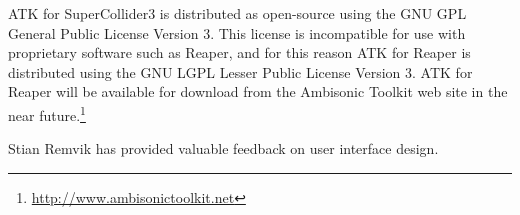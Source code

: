 \documentclass{article}
\begin{document}
ATK for SuperCollider3 is distributed as open-source using the GNU GPL General Public License Version 3.
This license is incompatible for use with proprietary software such as Reaper, and for this reason ATK for Reaper is distributed using the GNU LGPL Lesser Public License Version 3.
ATK for Reaper will be available for download from the Ambisonic Toolkit web site in the near future.\footnote{\href{http://www.ambisonictoolkit.net}{http://www.ambisonictoolkit.net}}


\begin{acknowledgments}
Stian Remvik has provided valuable feedback on user interface design.
\end{acknowledgments} 


\end{document}
